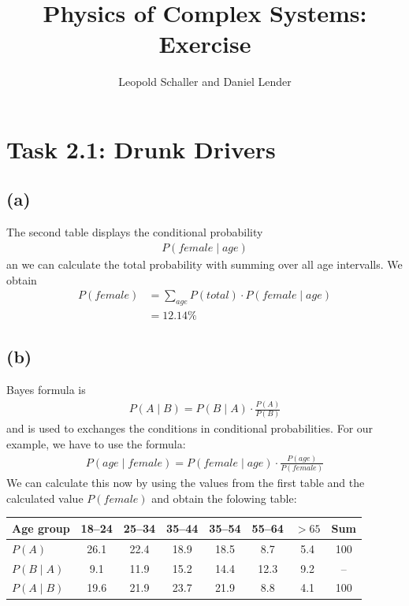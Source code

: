 \documentclass{article}
\title{Physics of Complex Systems: Exercise }
\author{Leopold Schaller and Daniel Lender}
\begin{document}
\maketitle

\section*{Task 2.1: Drunk Drivers}
\subsection*{(a)}
The second table displays the conditional probability
\begin{align}
    P \left( female \mid age \right)
\end{align}
an we can calculate the total probability with summing over all age intervalls. We obtain
\begin{align}
    P \left( female \right) &= \sum_{ age} P \left( total \right) \cdot P \left( female \mid age \right)\\
                              &= 12.14 \%
\end{align}

\subsection*{(b)}
    Bayes formula is
\begin{align}
    P \left( A \mid B \right) = P \left( B \mid A \right) \cdot \frac{P \left( A  \right)}{P \left( B \right)}
\end{align}
    and is used to exchanges the conditions in conditional probabilities. For our example, we have to use the formula:
\begin{align}
    P \left( age \mid female \right) = P \left( female \mid age \right) \cdot \frac{P \left( age  \right)}{P \left( female \right)}
\end{align}
    We can calculate this now by using the values from the first table and the calculated value $P \left( female \right)$ and obtain the folowing table:
\\
\begin{table}[h]
\centering
\begin{tabular}{l|ccccccc}
\toprule
Age group & 18--24 & 25--34 & 35--44 & 35--54 & 55--64 & $>65$ & Sum \\
\midrule
$P(A)$ & 26.1 & 22.4 & 18.9 & 18.5 & 8.7 & 5.4 & 100 \\
$P(B \mid A)$ & 9.1 & 11.9 & 15.2 & 14.4 & 12.3 & 9.2 & -- \\
$P(A \mid B)$ & 19.6 & 21.9 & 23.7 & 21.9 & 8.8 & 4.1 & 100 \\
\bottomrule
\end{tabular}
\end{table}
\end{document}
